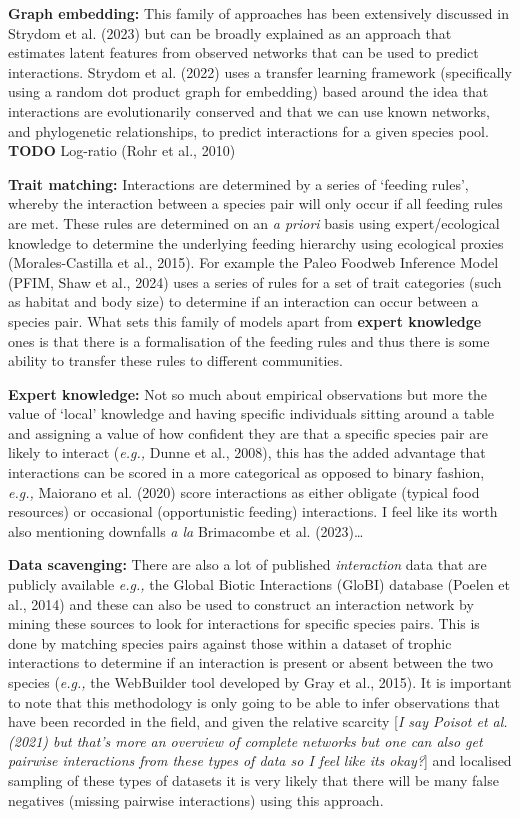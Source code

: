 \documentclass[
]{article}
\begin{document}
\textbf{Graph embedding:} This family of approaches has been extensively
discussed in Strydom et al. (2023) but can be broadly explained as an
approach that estimates latent features from observed networks that can
be used to predict interactions. Strydom et al. (2022) uses a transfer
learning framework (specifically using a random dot product graph for
embedding) based around the idea that interactions are evolutionarily
conserved and that we can use known networks, and phylogenetic
relationships, to predict interactions for a given species pool.
\textbf{TODO} Log-ratio (Rohr et al., 2010)

\textbf{Trait matching:} Interactions are determined by a series of
`feeding rules', whereby the interaction between a species pair will
only occur if all feeding rules are met. These rules are determined on
an \emph{a priori} basis using expert/ecological knowledge to determine
the underlying feeding hierarchy using ecological proxies
(Morales-Castilla et al., 2015). For example the Paleo Foodweb Inference
Model (PFIM, Shaw et al., 2024) uses a series of rules for a set of
trait categories (such as habitat and body size) to determine if an
interaction can occur between a species pair. What sets this family of
models apart from \textbf{expert knowledge} ones is that there is a
formalisation of the feeding rules and thus there is some ability to
transfer these rules to different communities.

\textbf{Expert knowledge:} Not so much about empirical observations but
more the value of `local' knowledge and having specific individuals
sitting around a table and assigning a value of how confident they are
that a specific species pair are likely to interact (\emph{e.g.,} Dunne
et al., 2008), this has the added advantage that interactions can be
scored in a more categorical as opposed to binary fashion, \emph{e.g.,}
Maiorano et al. (2020) score interactions as either obligate (typical
food resources) or occasional (opportunistic feeding) interactions. I
feel like its worth also mentioning downfalls \emph{a la} Brimacombe et
al. (2023)\ldots{}

\textbf{Data scavenging:} There are also a lot of published
\emph{interaction} data that are publicly available \emph{e.g.,} the
Global Biotic Interactions (GloBI) database (Poelen et al., 2014) and
these can also be used to construct an interaction network by mining
these sources to look for interactions for specific species pairs. This
is done by matching species pairs against those within a dataset of
trophic interactions to determine if an interaction is present or absent
between the two species (\emph{e.g.,} the WebBuilder tool developed by
Gray et al., 2015). It is important to note that this methodology is
only going to be able to infer observations that have been recorded in
the field, and given the relative scarcity {[}\emph{I say Poisot et al.
(2021) but that's more an overview of complete networks but one can also
get pairwise interactions from these types of data so I feel like its
okay?}{]} and localised sampling of these types of datasets it is very
likely that there will be many false negatives (missing pairwise
interactions) using this approach.
\end{document}
